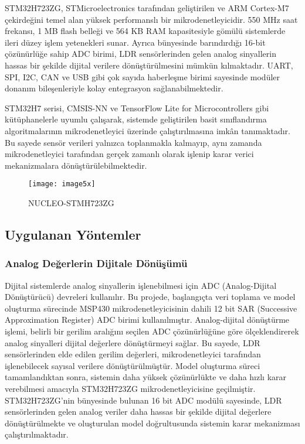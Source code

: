 STM32H723ZG, STMicroelectronics tarafından geliştirilen ve ARM Cortex-M7 çekirdeğini temel alan yüksek performanslı bir mikrodenetleyicidir. 550 MHz saat frekansı, 1 MB flash belleği ve 564 KB RAM kapasitesiyle gömülü sistemlerde ileri düzey işlem yetenekleri sunar. Ayrıca bünyesinde barındırdığı 16-bit çözünürlüğe sahip ADC birimi, LDR sensörlerinden gelen analog sinyallerin hassas bir şekilde dijital verilere dönüştürülmesini mümkün kılmaktadır. UART, SPI, I2C, CAN ve USB gibi çok sayıda haberleşme birimi sayesinde modüler donanım bileşenleriyle kolay entegrasyon sağlanabilmektedir.  

STM32H7 serisi, CMSIS-NN ve TensorFlow Lite for Microcontrollers gibi kütüphanelerle uyumlu çalışarak, sistemde geliştirilen basit sınıflandırma algoritmalarının mikrodenetleyici üzerinde çalıştırılmasına imkân tanımaktadır. Bu sayede sensör verileri yalnızca toplanmakla kalmayıp, aynı zamanda mikrodenetleyici tarafından gerçek zamanlı olarak işlenip karar verici mekanizmalara dönüştürülebilmektedir.

\begin{figure}
    \centering
    \texttt{[image: image5x]}
    \caption{NUCLEO-STMH723ZG}
    \label{fig:nucleo}
\end{figure}

\subsection{Uygulanan Yöntemler}


\subsubsection{Analog Değerlerin Dijitale Dönüşümü}

Dijital sistemlerde analog sinyallerin işlenebilmesi için ADC (Analog-Dijital Dönüştürücü) devreleri kullanılır. Bu projede, başlangıçta veri toplama ve model oluşturma sürecinde MSP430 mikrodenetleyicisinin dahili 12 bit SAR (Successive Approximation Register) ADC birimi kullanılmıştır. Analog-dijital dönüştürme işlemi, belirli bir gerilim aralığını seçilen ADC çözünürlüğüne göre ölçeklendirerek analog sinyalleri dijital değerlere dönüştürmeyi sağlar. Bu sayede, LDR sensörlerinden elde edilen gerilim değerleri, mikrodenetleyici tarafından işlenebilecek sayısal verilere dönüştürülmüştür. Model oluşturma süreci tamamlandıktan sonra, sistemin daha yüksek çözünürlükte ve daha hızlı karar verebilmesi amacıyla STM32H723ZG mikrodenetleyicisine geçilmiştir. STM32H723ZG'nin bünyesinde bulunan 16 bit ADC modülü sayesinde, LDR sensörlerinden gelen analog veriler daha hassas bir şekilde dijital değerlere dönüştürülmekte ve oluşturulan model doğrultusunda sistemin karar mekanizması çalıştırılmaktadır.


